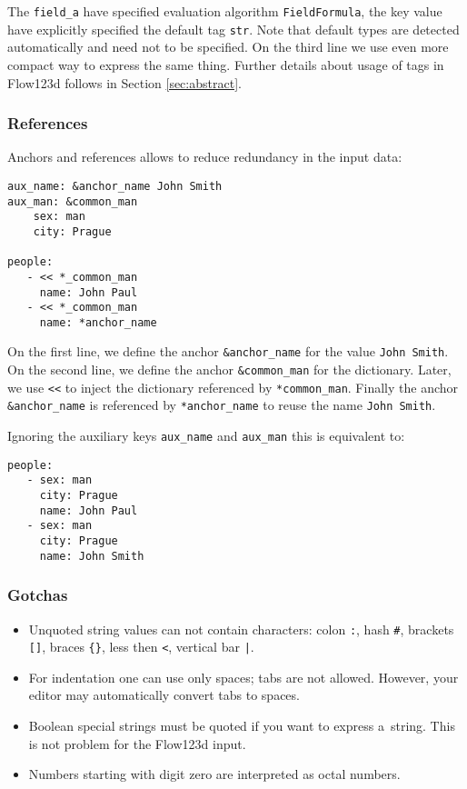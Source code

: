 The \verb'field_a' have specified evaluation algorithm \verb'FieldFormula', the key value have explicitly specified the default tag \verb'str'.
Note that default types are detected automatically and need not to be specified. On the third line we use even more compact way to 
express the same thing. Further details about usage of tags in Flow123d follows in Section \ref{sec:abstract}.

\subsubsection{References}
Anchors and references allows to reduce redundancy in the input data:
\begin{verbatim}
aux_name: &anchor_name John Smith
aux_man: &common_man
    sex: man
    city: Prague
    
people:
   - << *_common_man
     name: John Paul
   - << *_common_man
     name: *anchor_name
\end{verbatim}
On the first line, we define the anchor \verb'&anchor_name' for the value \verb'John Smith'. On the second line, 
we define the anchor \verb'&common_man' for the dictionary. Later, we use \verb'<<' to inject the dictionary 
referenced by \verb'*common_man'. Finally the anchor \verb'&anchor_name' is referenced by \verb'*anchor_name' to reuse the 
name \verb'John Smith'.

Ignoring the auxiliary keys \verb'aux_name' and \verb'aux_man' this is equivalent to:
\begin{verbatim}
people:
   - sex: man
     city: Prague
     name: John Paul
   - sex: man
     city: Prague
     name: John Smith
\end{verbatim}


\subsubsection{Gotchas}
\begin{itemize}
 \item Unquoted string values can not contain characters: colon \verb':', hash \verb'#', 
 brackets \verb'[]', braces \verb'{}', less then \verb'<', vertical bar \verb'|'.
 \item For indentation one can use only spaces; tabs are not allowed. However, your editor may automatically convert tabs to spaces.
 \item Boolean special strings must be quoted if you want to express a~string. This is not problem for the Flow123d input.
 \item Numbers starting with digit zero are interpreted as octal numbers. 
\end{itemize}

